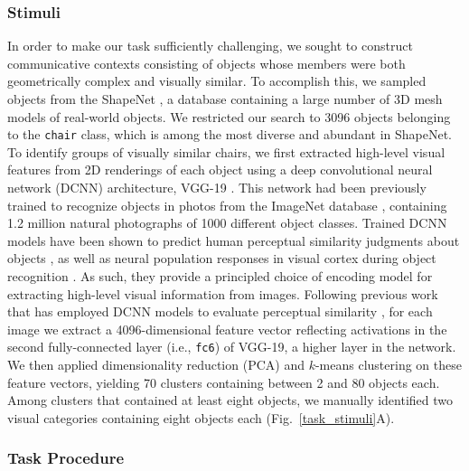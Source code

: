 \subsubsection{Stimuli}

In order to make our task sufficiently challenging, we sought to construct communicative contexts consisting of objects whose members were both geometrically complex and visually similar.
To accomplish this, we sampled objects from the ShapeNet \cite{chang2015shapenet}, a database containing a large number of 3D mesh models of real-world objects. %
We restricted our search to 3096 objects belonging to the \texttt{chair} class, which is among the most diverse and abundant in ShapeNet.
To identify groups of visually similar chairs, we first extracted high-level visual features from 2D renderings of each object using a deep convolutional neural network (DCNN) architecture, VGG-19 \cite{simonyan2014very}.
This network had been previously trained to recognize objects in photos from the ImageNet database \cite{deng2009imagenet}, containing 1.2 million natural photographs of 1000 different object classes.
Trained DCNN models have been shown to predict human perceptual similarity judgments about objects \cite{kubilius2016deep,peterson2018evaluating}, as well as neural population responses in visual cortex during object recognition \cite{yamins2014performance,gucclu2015deep}.
As such, they provide a principled choice of encoding model for extracting high-level visual information from images.
Following previous work that has employed DCNN models to evaluate perceptual similarity \cite{peterson2018evaluating,kubilius2016deep}, for each image we extract a 4096-dimensional feature vector reflecting activations in the second fully-connected layer (i.e., \texttt{fc6}) of VGG-19, a higher layer in the network.
We then applied dimensionality reduction (PCA) and $k$-means clustering on these feature vectors, yielding 70 clusters containing between 2 and 80 objects each.
Among clusters that contained at least eight objects, we manually identified two visual categories containing eight objects each (Fig.~\ref{task_stimuli}A).

\subsubsection{Task Procedure}

